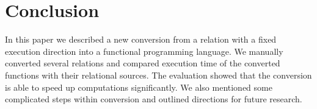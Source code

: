\section{Conclusion}

In this paper we described a new conversion from a \mk relation with a fixed execution direction into a functional programming language.
We manually converted several \mk relations and compared execution time of the converted functions with their relational sources.
The evaluation showed that the conversion is able to speed up computations significantly.
We also mentioned some complicated steps within conversion and outlined directions for future research.
